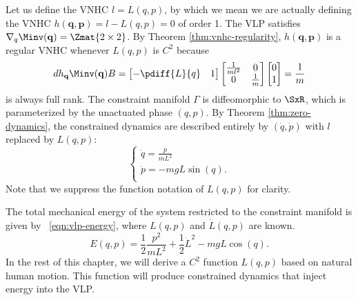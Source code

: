 Let us define the VNHC \(l = L(q,p)\), by which we mean we are
actually defining the VNHC \(h(\mathbf{q},\mathbf{p}) = l - L(q,p) = 0\) of
order 1.
The VLP satisfies
\(\nabla_q \Minv(\mathbf{q}) = \Zmat{2 \times 2}\).
By Theorem \ref{thm:vnhc-regularity},
\(h(\mathbf{q},\mathbf{p})\) is a regular VNHC whenever 
\(L(q,p)\) is \(C^2\) because
\[
   dh_{\mathbf{q}} \Minv(\mathbf{q})B = 
   \begin{bmatrix}
      -\pdiff{L}{q} & 1
   \end{bmatrix}
   \begin{bmatrix}
      \frac{1}{ml^2}  & 0 \\
      0 & \frac{1}{m}
   \end{bmatrix} 
   \begin{bmatrix}
      0 \\ 
      1
   \end{bmatrix}
   = \frac{1}{m}
\]
is always full rank.
The constraint manifold \(\Gamma\) is diffeomorphic to 
\(\SxR\), which is parameterized by the unactuated
phase \((q,p)\).
By Theorem \ref{thm:zero-dynamics}, the constrained dynamics
are described entirely by \((\dot{q},\dot{p})\) with \(l\)
replaced by \(L(q,p)\):
\begin{equation}\label{eqn:vlp-hamiltonian}
   \begin{cases}
      \dot{q} = \frac{p}{m L^2} \\
      \dot{p} = -mgL\sin(q)
      . \\ 
   \end{cases}
\end{equation}
Note that we suppress the function notation of \(L(q,p)\) for clarity.

The total mechanical energy of the system restricted to the constraint manifold
is given by ~\eqref{eqn:vlp-energy}, where \(L(q,p)\) and \(\dot{L}(q,p)\) are
known.
\begin{equation}\label{eqn:vlp-energy}
   E(q,p) = \frac{1}{2} \frac{p^2}{mL^2} + \frac{1}{2}\dot{L}^2 - mgL\cos(q)
   .
\end{equation}
In the rest of this chapter, we will derive a \(C^2\) function \(L(q,p)\) based
on natural human motion.
This function will produce constrained dynamics that inject energy into the VLP.

